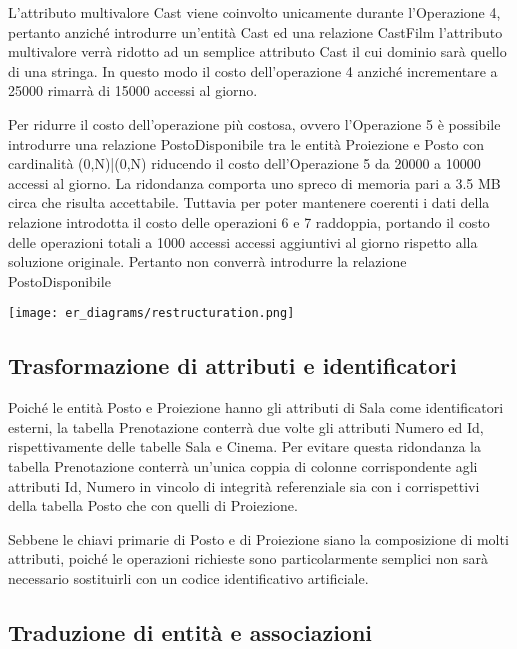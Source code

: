 L'attributo multivalore Cast viene coinvolto unicamente durante l'Operazione 4,
pertanto anziché introdurre un'entità Cast ed una relazione CastFilm
l'attributo multivalore verrà ridotto ad un semplice attributo Cast il cui
dominio sarà quello di una stringa.
In questo modo il costo dell'operazione 4 anziché incrementare a 25000 
rimarrà di 15000 accessi al giorno.

Per ridurre il costo dell'operazione più costosa, ovvero l'Operazione 5 è
possibile introdurre una relazione PostoDisponibile tra le entità Proiezione e
Posto con cardinalità (0,N)|(0,N) riducendo il costo dell'Operazione 5 da
20000 a 10000 accessi al giorno.
La ridondanza comporta uno spreco di memoria pari a
3.5 MB circa che risulta accettabile.
Tuttavia per poter mantenere coerenti i dati della relazione introdotta il costo
delle operazioni 6 e 7 raddoppia, portando il costo delle operazioni totali a
1000 accessi accessi aggiuntivi al giorno rispetto alla soluzione originale.
Pertanto non converrà introdurre la relazione PostoDisponibile

\texttt{[image: er\_diagrams/restructuration.png]}

\subsection*{Trasformazione di attributi e identificatori}
%
%

Poiché le entità Posto e Proiezione hanno gli attributi di Sala come
identificatori esterni, la tabella Prenotazione conterrà due volte gli attributi
Numero ed Id, rispettivamente delle tabelle Sala e Cinema.
Per evitare questa ridondanza la tabella Prenotazione conterrà un'unica coppia
di colonne corrispondente agli attributi Id, Numero in vincolo di integrità
referenziale sia con i corrispettivi della tabella Posto che con quelli di
Proiezione.

Sebbene le chiavi primarie di Posto e di Proiezione siano la composizione di
molti attributi, poiché le operazioni richieste sono particolarmente semplici
non sarà necessario sostituirli con un codice identificativo artificiale.

\pagebreak
\subsection*{Traduzione di entità e associazioni}
%
%

